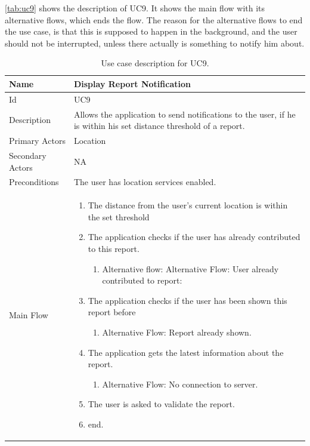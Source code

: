 \autoref{tab:uc9} shows the description of UC9. It shows the main flow with its alternative flows, which ends the flow. The reason for the alternative flows to end the use case, is that this is supposed to happen in the background, and the user should not be interrupted, unless there actually is something to notify him about.
\begin{table}[p]
\caption{Use case description for UC9.}\label{tab:uc9}
\begin{tabularx}{\textwidth}{|l|X|}
\hline
Name              & Display Report Notification \\ \hline 
Id                & UC9 \\ \hline
Description       & Allows the application to send notifications to the user, if he is within his set distance threshold of a report. \\ \hline
Primary Actors    & Location \\ \hline
Secondary Actors  & NA \\ \hline
Preconditions     & The user has location services enabled. \\ \hline
Main Flow         &
{\footnotesize \begin{enumerate}
\item The distance from the user’s current location is within the set threshold
\item The application checks if the user has already contributed to this report.
\begin{enumerate}
\item Alternative flow: Alternative Flow: User already contributed to report:
\end{enumerate}
\item The application checks if the user has been shown this report before
\begin{enumerate}
\item Alternative Flow: Report already shown.
\end{enumerate}
\item The application gets the latest information about the report.
\begin{enumerate}
\item Alternative Flow: No connection to server.
\end{enumerate}
\item The user is asked to validate the report.
\item end.
\end{enumerate}} \\ \hline

\end{tabularx}
\end{table}
